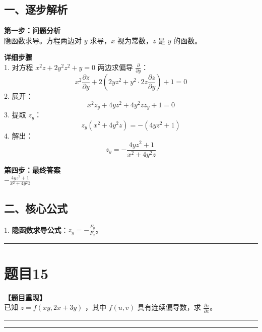 \documentclass[12pt, a4paper]{ctexart}
\newcommand{\TopSeparator}{
    \par\noindent\rule{\textwidth}{1.5pt}\vspace{0.5em} %
}
\newcommand{\AnalysisSeparator}{
    \par\noindent\rule{\textwidth}{0.5pt}\vspace{0.2em}\hrule\vspace{0.5em} %
}
\newenvironment{RedAnalysis}{
    \par
    \color{red} %
}{
    \par
    \color{black} %
}
\begin{document}
\begin{RedAnalysis}

\subsection*{一、逐步解析}

\textbf{第一步：问题分析} \\
隐函数求导。方程两边对 $y$ 求导，$x$ 视为常数，$z$ 是 $y$ 的函数。

\textbf{详细步骤} \\
1. 对方程 $x^2 z + 2y^2 z^2 + y = 0$ 两边求偏导 $\frac{\partial}{\partial y}$：
   \[ x^2 \frac{\partial z}{\partial y} + 2(2y z^2 + y^2 \cdot 2z \frac{\partial z}{\partial y}) + 1 = 0 \]
2. 展开：
   \[ x^2 z_y + 4y z^2 + 4y^2 z z_y + 1 = 0 \]
3. 提取 $z_y$：
   \[ z_y (x^2 + 4y^2 z) = - (4y z^2 + 1) \]
4. 解出：
   \[ z_y = - \frac{4y z^2 + 1}{x^2 + 4y^2 z} \]

\textbf{第四步：最终答案} \\
$ - \frac{4y z^2 + 1}{x^2 + 4y^2 z} $

\subsection*{二、核心公式}
1. \textbf{隐函数求导公式}：$z_y = - \frac{F_y}{F_z}$。

\end{RedAnalysis}

\vspace{2em}

\TopSeparator
\section*{题目15}

\textbf{【题目重现】} \\
已知 $ z = f(xy, 2x + 3y) $ ，其中 $ f(u, v) $ 具有连续偏导数，求 $ \frac{\partial z}{\partial x} $。

\AnalysisSeparator
\end{document}
